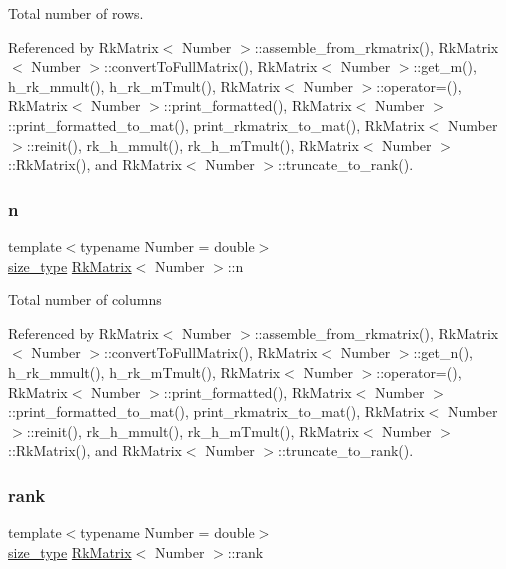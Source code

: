 Total number of rows. 

Referenced by Rk\+Matrix$<$ Number $>$\+::assemble\+\_\+from\+\_\+rkmatrix(), Rk\+Matrix$<$ Number $>$\+::convert\+To\+Full\+Matrix(), Rk\+Matrix$<$ Number $>$\+::get\+\_\+m(), h\+\_\+rk\+\_\+mmult(), h\+\_\+rk\+\_\+m\+Tmult(), Rk\+Matrix$<$ Number $>$\+::operator=(), Rk\+Matrix$<$ Number $>$\+::print\+\_\+formatted(), Rk\+Matrix$<$ Number $>$\+::print\+\_\+formatted\+\_\+to\+\_\+mat(), print\+\_\+rkmatrix\+\_\+to\+\_\+mat(), Rk\+Matrix$<$ Number $>$\+::reinit(), rk\+\_\+h\+\_\+mmult(), rk\+\_\+h\+\_\+m\+Tmult(), Rk\+Matrix$<$ Number $>$\+::\+Rk\+Matrix(), and Rk\+Matrix$<$ Number $>$\+::truncate\+\_\+to\+\_\+rank().

\mbox{\label{classRkMatrix_a06d3b6636bb423c391c66e4ccc722687}} 
\subsubsection{\texorpdfstring{n}{n}}
{\footnotesize\ttfamily template$<$typename Number = double$>$ \\
\hyperlink{classRkMatrix_add060bfc3a4cc77f858c3d6dd58cadd5}{size\+\_\+type} \hyperlink{classRkMatrix}{Rk\+Matrix}$<$ Number $>$\+::n\hspace{0.3cm}{\ttfamily [private]}}

Total number of columns 

Referenced by Rk\+Matrix$<$ Number $>$\+::assemble\+\_\+from\+\_\+rkmatrix(), Rk\+Matrix$<$ Number $>$\+::convert\+To\+Full\+Matrix(), Rk\+Matrix$<$ Number $>$\+::get\+\_\+n(), h\+\_\+rk\+\_\+mmult(), h\+\_\+rk\+\_\+m\+Tmult(), Rk\+Matrix$<$ Number $>$\+::operator=(), Rk\+Matrix$<$ Number $>$\+::print\+\_\+formatted(), Rk\+Matrix$<$ Number $>$\+::print\+\_\+formatted\+\_\+to\+\_\+mat(), print\+\_\+rkmatrix\+\_\+to\+\_\+mat(), Rk\+Matrix$<$ Number $>$\+::reinit(), rk\+\_\+h\+\_\+mmult(), rk\+\_\+h\+\_\+m\+Tmult(), Rk\+Matrix$<$ Number $>$\+::\+Rk\+Matrix(), and Rk\+Matrix$<$ Number $>$\+::truncate\+\_\+to\+\_\+rank().

\mbox{\label{classRkMatrix_aa9e60bb24bbe3ab1750f970f296d8256}} 
\subsubsection{\texorpdfstring{rank}{rank}}
{\footnotesize\ttfamily template$<$typename Number = double$>$ \\
\hyperlink{classRkMatrix_add060bfc3a4cc77f858c3d6dd58cadd5}{size\+\_\+type} \hyperlink{classRkMatrix}{Rk\+Matrix}$<$ Number $>$\+::rank\hspace{0.3cm}{\ttfamily [private]}}

